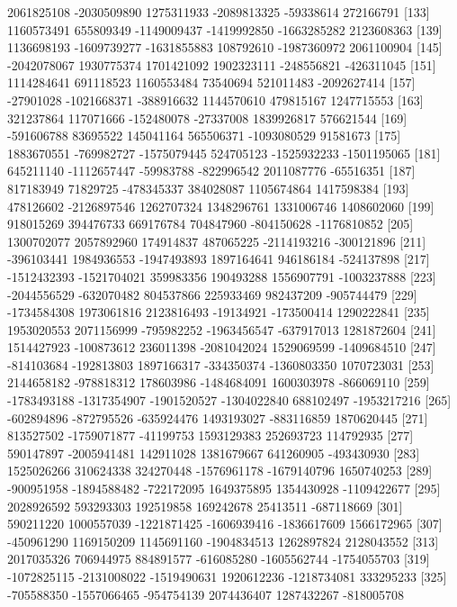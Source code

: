 \documentclass[11pt]{article}
\begin{document}
{\begin{Schunk}
\begin{Soutput}
[127]  2061825108 -2030509890  1275311933 -2089813325   -59338614   272166791
[133]  1160573491   655809349 -1149009437 -1419992850 -1663285282  2123608363
[139]  1136698193 -1609739277 -1631855883   108792610 -1987360972  2061100904
[145] -2042078067  1930775374  1701421092  1902323111  -248556821  -426311045
[151]  1114284641   691118523  1160553484    73540694   521011483 -2092627414
[157]   -27901028 -1021668371  -388916632  1144570610   479815167  1247715553
[163]   321237864   117071666  -152480078   -27337008  1839926817   576621544
[169]  -591606788    83695522   145041164   565506371 -1093080529    91581673
[175]  1883670551  -769982727 -1575079445   524705123 -1525932233 -1501195065
[181]   645211140 -1112657447   -59983788  -822996542  2011087776   -65516351
[187]   817183949    71829725  -478345337   384028087  1105674864  1417598384
[193]   478126602 -2126897546  1262707324  1348296761  1331006746  1408602060
[199]   918015269   394476733   669176784   704847960  -804150628 -1176810852
[205]  1300702077  2057892960   174914837   487065225 -2114193216  -300121896
[211]  -396103441  1984936553 -1947493893  1897164641   946186184  -524137898
[217] -1512432393 -1521704021   359983356   190493288  1556907791 -1003237888
[223] -2044556529  -632070482   804537866   225933469   982437209  -905744479
[229] -1734584308  1973061816  2123816493   -19134921  -173500414  1290222841
[235]  1953020553  2071156999  -795982252 -1963456547  -637917013  1281872604
[241]  1514427923  -100873612   236011398 -2081042024  1529069599 -1409684510
[247]  -814103684  -192813803  1897166317  -334350374 -1360803350  1070723031
[253]  2144658182  -978818312   178603986 -1484684091  1600303978  -866069110
[259] -1783493188 -1317354907 -1901520527 -1304022840   688102497 -1953217216
[265]  -602894896  -872795526  -635924476  1493193027  -883116859  1870620445
[271]   813527502 -1759071877   -41199753  1593129383   252693723   114792935
[277]   590147897 -2005941481   142911028  1381679667   641260905  -493430930
[283]  1525026266   310624338   324270448 -1576961178 -1679140796  1650740253
[289]  -900951958 -1894588482  -722172095  1649375895  1354430928 -1109422677
[295]  2028926592   593293303   192519858   169242678    25413511  -687118669
[301]   590211220  1000557039 -1221871425 -1606939416 -1836617609  1566172965
[307]  -450961290  1169150209  1145691160 -1904834513  1262897824  2128043552
[313]  2017035326   706944975   884891577  -616085280 -1605562744 -1754055703
[319] -1072825115 -2131008022 -1519490631  1920612236 -1218734081   333295233
[325]  -705588350 -1557066465  -954754139  2074436407  1287432267  -818005708

\end{Soutput}
\end{Schunk}}
\end{document}

